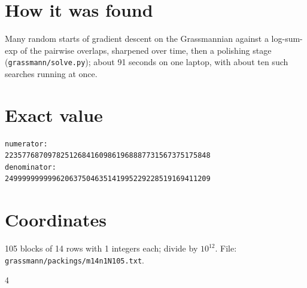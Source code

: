 \documentclass[11pt,a4paper]{article}
\begin{document}
\section{How it was found}
Many random starts of gradient descent on the Grassmannian against a log-sum-exp of the pairwise overlaps, sharpened over time, then a polishing stage (\texttt{grassmann/solve.py}); about 91 seconds on one laptop, with about ten such searches running at once.


\appendix
\section{Exact value}
{\small
\begin{verbatim}
numerator:
223577687097825126841609861968887731567375175848
denominator:
249999999999620637504635141995229228519169411209
\end{verbatim}}

\section{Coordinates}
105 blocks of 14 rows with 1 integers each; divide by $10^{12}$. File: \texttt{grassmann/packings/m14n1N105.txt}.
{\tiny
\begin{multicols}{4}
\end{multicols}}
\end{document}
